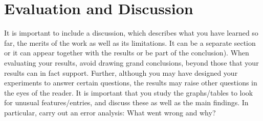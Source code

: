 \section{Evaluation and Discussion}
\label{sec:Discussion}

It is important to include a discussion, which describes what you have learned so far, the merits of the work as well as its limitations. 
It can be a separate section or it can appear together with the results or be part of the conclusion).
When evaluating your results, avoid drawing grand conclusions, beyond those that your results can in fact support. 
Further, although you may have designed your experiments to answer certain questions, 
the results may raise other questions in the eyes of the reader. 
It is important that you study the graphs/tables to look for unusual features/entries, and discuss these as well as the main findings.
In particular, carry out an error analysis: What went wrong and why? 

